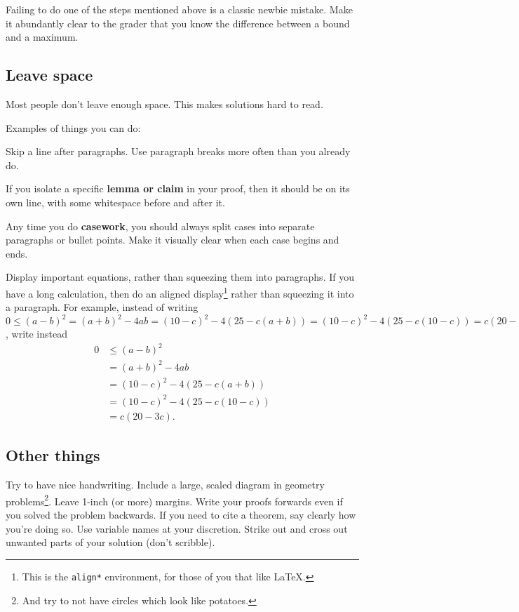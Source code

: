 \documentclass[11pt]{scrartcl}
\begin{document}
Failing to do one of the steps mentioned above is a classic newbie mistake.
Make it abundantly clear to the grader that you know the difference
between a bound and a maximum.

\subsection{Leave space}
Most people don't leave enough space.
This makes solutions hard to read.

Examples of things you can do:
\begin{itemize}
	\ii Skip a line after paragraphs.
	Use paragraph breaks more often than you already do.

	\ii If you isolate a specific \textbf{lemma or claim} in your proof,
	then it should be on its own line,
	with some whitespace before and after it.

	\ii Any time you do \textbf{casework},
	you should always split cases into separate paragraphs
	or bullet points.
	Make it visually clear when each case begins and ends.

	\ii Display important equations,
	rather than squeezing them into paragraphs.
	If you have a long calculation,
	then do an aligned display\footnote{This is the
		\texttt{align*} environment,
		for those of you that like \LaTeX.}
	rather than squeezing it into a paragraph.
	For example, instead of writing $0 \le {(a - b)^2} = {(a + b)^2} - 4ab = {(10 - c)^2} - 4\left( {25 - c(a + b)} \right) = {(10 - c)^2} - 4\left( {25 - c(10 - c)} \right) = c(20 - 3c)$, write instead
	\begin{align*}
		0 &\le {(a - b)^2}\\
		 &= {(a + b)^2} - 4ab\\
		 &= {(10 - c)^2} - 4\left( {25 - c(a + b)} \right)\\
		 &= {(10 - c)^2} - 4\left( {25 - c(10 - c)} \right)\\
		 &= c(20 - 3c).
	\end{align*}
\end{itemize}

\subsection{Other things}
Try to have nice handwriting.
Include a large, scaled diagram in geometry problems\footnote{And
try to not have circles which look like potatoes.}.
Leave 1-inch (or more) margins.
Write your proofs forwards even if you solved the problem backwards.
If you need to cite a theorem, say clearly how you're doing so.
Use variable names at your discretion.
Strike out and cross out unwanted parts of your solution (don't scribble).
\end{document}
